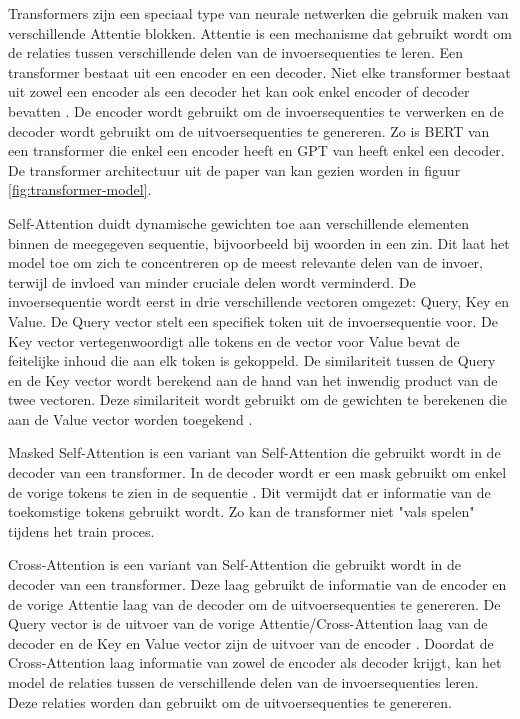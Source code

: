 Transformers zijn een speciaal type van neurale netwerken die gebruik maken van verschillende Attentie blokken.
Attentie is een mechanisme dat gebruikt wordt om de relaties tussen verschillende delen van de invoersequenties te leren.
Een transformer bestaat uit een encoder en een decoder. 
Niet elke transformer bestaat uit zowel een encoder als een decoder het kan ook enkel encoder of decoder bevatten \autocite{Hoque2023}.
De encoder wordt gebruikt om de invoersequenties te verwerken en de decoder wordt gebruikt om de uitvoersequenties te genereren.
Zo is BERT van \textcite{DevlinEtAl2019} een transformer die enkel een encoder heeft en GPT van \textcite{RandfordEtAL2018} heeft enkel een decoder.
De transformer architectuur uit de paper van \textcite{VaswaniEtAl2017} kan gezien worden in figuur \ref{fig:transformer-model}. 

Self-Attention duidt dynamische gewichten toe aan verschillende elementen binnen de meegegeven sequentie, bijvoorbeeld bij woorden in een zin.
Dit laat het model toe om zich te concentreren op de meest relevante delen van de invoer, terwijl de invloed van minder cruciale delen wordt verminderd.
De invoersequentie wordt eerst in drie verschillende vectoren omgezet: Query, Key en Value.
De Query vector stelt een specifiek token uit de invoersequentie voor. De Key vector vertegenwoordigt alle tokens en de vector voor Value bevat de feitelijke inhoud die aan elk token is gekoppeld.
De similariteit tussen de Query en de Key vector wordt berekend aan de hand van het inwendig product van de twee vectoren.
Deze similariteit wordt gebruikt om de gewichten te berekenen die aan de Value vector worden toegekend \autocite{VaswaniEtAl2017}.

Masked Self-Attention is een variant van Self-Attention die gebruikt wordt in de decoder van een transformer.
In de decoder wordt er een mask gebruikt om enkel de vorige tokens te zien in de sequentie \autocite{VaswaniEtAl2017}.
Dit vermijdt dat er informatie van de toekomstige tokens gebruikt wordt. 
Zo kan de transformer niet "vals spelen"  tijdens het train proces.

Cross-Attention is een variant van Self-Attention die gebruikt wordt in de decoder van een transformer.
Deze laag gebruikt de informatie van de encoder en de vorige Attentie laag van de decoder om de uitvoersequenties te genereren.
De Query vector is de uitvoer van de vorige Attentie/Cross-Attention laag van de decoder en de Key en Value vector zijn de uitvoer van de encoder \autocite{VaswaniEtAl2017}.
Doordat de Cross-Attention laag informatie van zowel de encoder als decoder krijgt, kan het model de relaties tussen de verschillende delen van de invoersequenties leren.
Deze relaties worden dan gebruikt om de uitvoersequenties te genereren.

